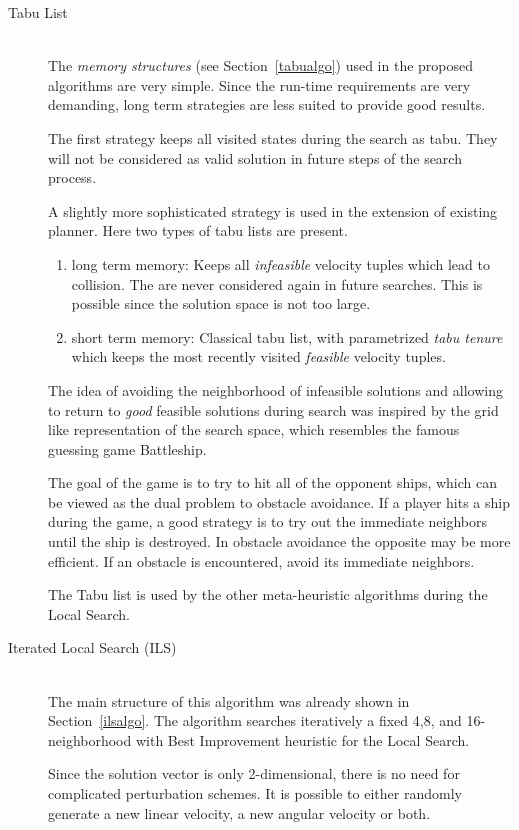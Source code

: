 \begin{description}
\item[Tabu List]\hfill \\
The \emph{memory structures} (see Section~\ref{tabualgo}) used in the proposed algorithms are very simple. 
Since the run-time requirements are very demanding, long term strategies are less suited to provide good results.

The first strategy keeps all visited states during the search as tabu. They will not be considered as valid solution in future steps of the search process. 

A slightly more sophisticated strategy is used in the extension of existing planner.
Here two types of tabu lists are present.
\begin{enumerate}
\item{long term memory:} Keeps all \emph{infeasible} velocity tuples which lead to collision. The are never considered again in future searches. This is possible since the solution space is not too large.
\item{short term memory:} Classical tabu list, with parametrized \emph{tabu tenure} which keeps the most recently visited \emph{feasible} velocity tuples.
\end{enumerate}

The idea of avoiding the neighborhood of infeasible solutions and allowing to return to \emph{good} feasible solutions during search was inspired by the grid like representation of the search space, which resembles the famous guessing game Battleship. 

The goal of the game is to try to hit all of the opponent ships, which can be viewed as the dual problem to obstacle avoidance. 
If a player hits a ship during the game, a good strategy is to try out the immediate neighbors until the ship is destroyed. 
In obstacle avoidance the opposite may be more efficient. If an obstacle is encountered, avoid its immediate neighbors.

The Tabu list is used by the other meta-heuristic algorithms during the Local Search.
\item[Iterated Local Search (ILS)]\hfill \\
The main structure of this algorithm was already shown in Section~\ref{ilsalgo}.
The algorithm searches iteratively a fixed 4,8, and 16-neighborhood with Best Improvement heuristic for the Local Search.

Since the solution vector is only 2-dimensional, there is no need for complicated perturbation schemes. 
It is possible to either randomly generate a new linear velocity, a new angular velocity or both. 


\end{description}
